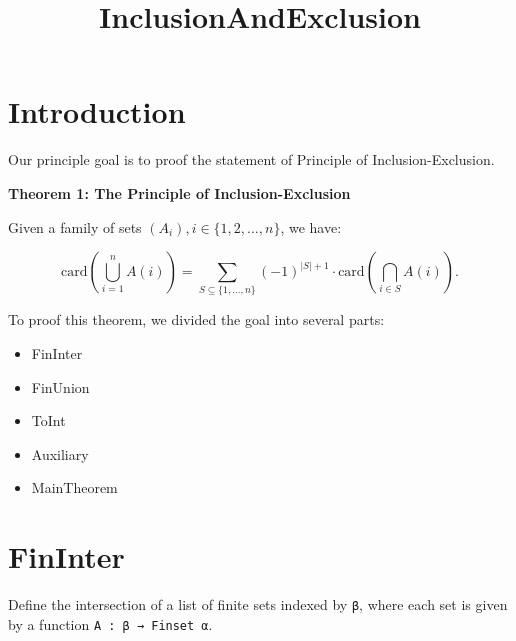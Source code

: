 \title{InclusionAndExclusion}




\maketitle


\tableofcontents

\nocite{*} %

\section{Introduction}

Our principle goal is to proof the statement of Principle of Inclusion-Exclusion.

\textbf{Theorem 1: The Principle of Inclusion-Exclusion}

    Given a family of sets $(A_{i}),i \in \{1,2,\dots ,n\}$, we have:

    \[
  \text{card} \left( \bigcup_{i=1}^n A(i) \right) = \sum_{S \subseteq \{1, \ldots, n\}} (-1)^{|S|+1} \cdot \text{card} \left( \bigcap_{i \in S} A(i) \right).
  \]


To proof this theorem, we divided the goal into several parts:

\begin{itemize}
  \item FinInter
  \item FinUnion
  \item ToInt
  \item Auxiliary
  \item MainTheorem
\end{itemize}

\section{FinInter}

\begin{definition}\label{List.FinInter}
  \leanok
  Define the intersection of a list of finite sets indexed by \verb|β|, where each set is given by a function \verb|A : β → Finset α|.
\end{definition}

